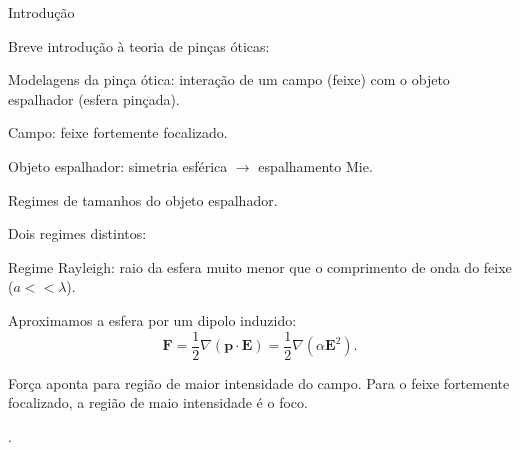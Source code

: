 \documentclass[10pt]{beamer}
\begin{document}

\begin{frame}[fragile]{Introdução}

Breve introdução à teoria de pinças óticas: \\
    \begin{center}
        Modelagens da pinça ótica: interação de um campo (feixe) com o objeto espalhador (esfera pinçada).

        Campo: feixe fortemente focalizado.

        Objeto espalhador: simetria esférica $\rightarrow$ espalhamento Mie.

        

    \end{center}

\end{frame}

\begin{frame}[fragile]{Regimes de tamanhos do objeto espalhador.}

Dois regimes distintos: \\
    \begin{center}
        Regime Rayleigh: raio da esfera muito menor que o comprimento de onda do feixe ($a<<\lambda$).

        Aproximamos a esfera por um dipolo induzido:
        \begin{equation}
        {\mathbf F} = \frac{1}{2}\nabla({\mathbf p}\cdot{\mathbf E})=\frac{1}{2}\nabla(\alpha{\mathbf E}^2).
        \end{equation}

        Força aponta para região de maior intensidade do campo. Para o feixe fortemente focalizado, a região de maio intensidade é o foco.

    \end{center}
.
\end{frame}
\end{document}
